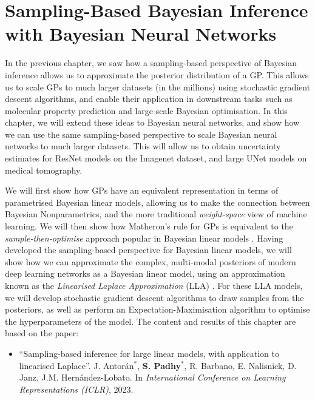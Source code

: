 \chapter[Sampling-Based Bayesian Inference with Bayesian Neural Networks]{Sampling-Based Bayesian Inference with Bayesian Neural Networks}
\label{chapter:bnn_sampling}
\ifpdf
    \graphicspath{{Chapter7/Figs/Raster/}{Chapter7/Figs/PDF/}{Chapter7/Figs/}}
\else
    \graphicspath{{Chapter7/Figs/Vector/}{Chapter7/Figs/}}
\fi

In the previous chapter, we saw how a sampling-based perspective of Bayesian inference allows us to approximate the posterior distribution of a GP. This allows us to scale GPs to much larger datasets (in the millions) using stochastic gradient descent algorithms, and enable their application in downstream tasks such as molecular property prediction and large-scale Bayesian optimisation. In this chapter, we will extend these ideas to Bayesian neural networks, and show how we can use the same sampling-based perspective to scale Bayesian neural networks to much larger datasets. This will allow us to obtain uncertainty estimates for ResNet models on the Imagenet dataset, and large UNet models on medical tomography.

We will first show how GPs have an equivalent representation in terms of parametrised Bayesian linear models, allowing us to make the connection between Bayesian Nonparametrics, and the more traditional \emph{weight-space} view of machine learning. We will then show how Matheron's rule for GPs is equivalent to the \emph{sample-then-optimise} approach popular in Bayesian linear models \citep{matthews2017scalable}. Having developed the sampling-based perspective for Bayesian linear models, we will show how we can approximate the complex, multi-modal posteriors of modern deep learning networks as a Bayesian linear model, using an approximation known as the \emph{Linearised Laplace Approximation} (LLA) \citep{immer2021improving,antoran2022adapting}. For these LLA models, we will develop stochastic gradient descent algorithms to draw samples from the posteriors, as well as perform an Expectation-Maximisation algorithm to optimise the hyperparameters of the model. The content and results of this chapter are based on the paper:
\begin{itemize}
    \item ``Sampling-based inference for large linear models, with application to linearised Laplace''. J. Antorán$^{*}$, \textbf{S. Padhy}$^{*}$, R. Barbano, E. Nalisnick, D. Janz, J.M. Hernández-Lobato. In \textit{International Conference on Learning Representations (ICLR)}, 2023.
\end{itemize}

